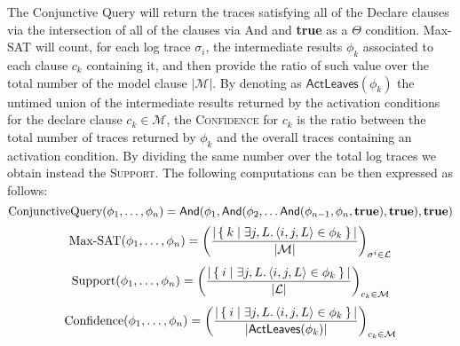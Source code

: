 The {Conjunctive Query} will return the traces satisfying all of the Declare clauses via the intersection of all of the clauses via \textsf{And} and \textbf{true} as a $\Theta$ condition. Max-SAT will count, for each log trace $\sigma_i$, the intermediate results $\phi_k$ associated to each clause $c_k$ containing it, and then provide the ratio of such value over the total number of the model clause $|\mathcal{M}|$. By denoting as $\textsf{ActLeaves}(\phi_k)$ the untimed union of the intermediate results returned by the activation conditions for the declare clause $c_k\in\mathcal{M}$, the \textsc{Confidence} for $c_k$ is the ratio between the total number of traces returned by $\phi_k$ and the overall traces containing an activation condition. By dividing the same number over the total log traces we obtain instead the \textsc{Support}. The following computations can be then expressed as follows:
\[\textup{ConjunctiveQuery}(\phi_1,\dots,\phi_n)=\textsf{And}(\phi_1,\textsf{And}(\phi_2,\dots\textsf{And}(\phi_{n-1},\phi_n,\textbf{true}),\textbf{true}),\textbf{true})\]
\[\textup{Max-SAT}(\phi_1,\dots,\phi_n)=\left(\frac{|\Set{k|\exists j,L. \braket{i,j,L}\in\phi_k}|}{|\mathcal{M}|}\right)_{\sigma^i\in \mathcal{L}}\]
\[\textup{Support}(\phi_1,\dots,\phi_n)=\left(\frac{|\Set{i|\exists j,L. \braket{i,j,L}\in \phi_k}|}{|\mathcal{L}|}\right)_{c_k\in \mathcal{M}}\]
\[\textup{Confidence}(\phi_1,\dots,\phi_n)=\left(\frac{|\Set{i|\exists j,L. \braket{i,j,L}\in \phi_k}|}{|\textsf{ActLeaves}(\phi_k)|}\right)_{c_k\in \mathcal{M}}\]



%	
%	
%	
%	
